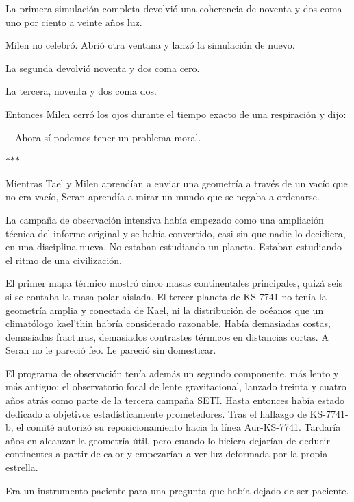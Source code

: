 \documentclass[11pt,a5paper,twoside]{book}
\begin{document}
La primera simulación completa devolvió una coherencia de noventa y dos coma uno por ciento a veinte años luz.

Milen no celebró. Abrió otra ventana y lanzó la simulación de nuevo.

La segunda devolvió noventa y dos coma cero.

La tercera, noventa y dos coma dos.

Entonces Milen cerró los ojos durante el tiempo exacto de una respiración y dijo:

—Ahora sí podemos tener un problema moral.

\vspace{1.5em}
\begin{center}$\ast$\quad$\ast$\quad$\ast$\end{center}
\vspace{1.5em}

Mientras Tael y Milen aprendían a enviar una geometría a través de un vacío que no era vacío, Seran aprendía a mirar un mundo que se negaba a ordenarse.

La campaña de observación intensiva había empezado como una ampliación técnica del informe original y se había convertido, casi sin que nadie lo decidiera, en una disciplina nueva. No estaban estudiando un planeta. Estaban estudiando el ritmo de una civilización.

El primer mapa térmico mostró cinco masas continentales principales, quizá seis si se contaba la masa polar aislada. El tercer planeta de KS-7741 no tenía la geometría amplia y conectada de Kael, ni la distribución de océanos que un climatólogo kael'thin habría considerado razonable. Había demasiadas costas, demasiadas fracturas, demasiados contrastes térmicos en distancias cortas. A Seran no le pareció feo. Le pareció sin domesticar.

El programa de observación tenía además un segundo componente, más lento y más antiguo: el observatorio focal de lente gravitacional, lanzado treinta y cuatro años atrás como parte de la tercera campaña SETI. Hasta entonces había estado dedicado a objetivos estadísticamente prometedores. Tras el hallazgo de KS-7741-b, el comité autorizó su reposicionamiento hacia la línea Aur-KS-7741. Tardaría años en alcanzar la geometría útil, pero cuando lo hiciera dejarían de deducir continentes a partir de calor y empezarían a ver luz deformada por la propia estrella.

Era un instrumento paciente para una pregunta que había dejado de ser paciente.
\end{document}
